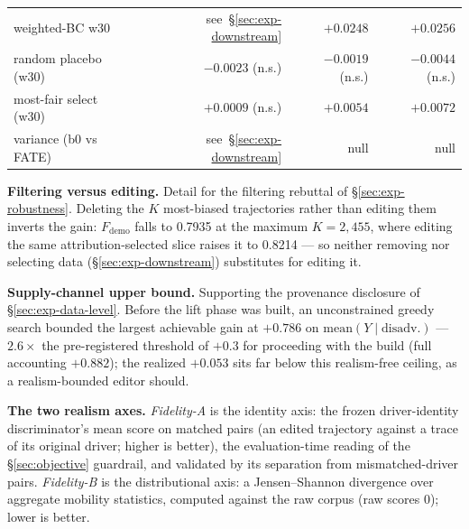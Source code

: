 \begin{table}[t]
\begin{tabular}{lrrr}
weighted-BC w30 & see~\S\ref{sec:exp-downstream} & $+0.0248$ & $+0.0256$ \\
\quad random placebo (w30) & $-0.0023$ (n.s.) & $-0.0019$ (n.s.) & $-0.0044$ (n.s.) \\
\quad most-fair select (w30) & $+0.0009$ (n.s.) & $+0.0054$ & $+0.0072$ \\
variance (b0 vs FATE) & see~\S\ref{sec:exp-downstream} & null & null \\ %
\bottomrule
\end{tabular}
\end{table}

\textbf{Filtering versus editing.} Detail for the filtering rebuttal of
\S\ref{sec:exp-robustness}. Deleting the $K$ most-biased trajectories rather
than editing them inverts the gain: $F_{\mathrm{demo}}$ falls to 0.7935 at the
maximum $K = 2{,}455$, where editing the same attribution-selected slice
raises it to 0.8214 --- so neither removing nor selecting data
(\S\ref{sec:exp-downstream}) substitutes for editing it.

\textbf{Supply-channel upper bound.} Supporting the provenance disclosure of
\S\ref{sec:exp-data-level}. Before the lift phase was built, an unconstrained
greedy search bounded the largest achievable gain at $+0.786$ on
$\mathrm{mean}(Y \mid \mathrm{disadv.})$ --- $2.6\times$ the pre-registered
threshold of $+0.3$ for proceeding with the build (full accounting
$+0.882$); the realized $+0.053$ sits far below this realism-free ceiling,
as a realism-bounded editor should.

\textbf{The two realism axes.} \emph{Fidelity-A} is the identity axis: the
frozen driver-identity discriminator's mean score on matched pairs (an
edited trajectory against a trace of its original driver; higher is
better), the evaluation-time reading of the \S\ref{sec:objective}
guardrail, and validated by its separation from mismatched-driver pairs.
\emph{Fidelity-B} is the distributional axis: a Jensen--Shannon divergence
over aggregate mobility statistics, computed against the raw corpus (raw
scores 0); lower is better.

